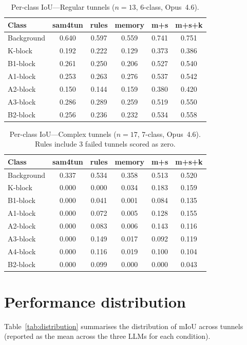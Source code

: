 \begin{table}[ht]
\caption{Per-class IoU---Regular tunnels ($n=13$, 6-class, Opus~4.6).}\label{tab:perclass-regular}
\begin{tabular*}{\tblwidth}{@{} l c c c c c @{}}
\toprule
Class & sam4tun & rules & memory & m+s & m+s+k \\
\midrule
Background & 0.640 & 0.597 & 0.559 & 0.741 & 0.751 \\
K-block & 0.192 & 0.222 & 0.129 & 0.373 & 0.386 \\
B1-block & 0.261 & 0.250 & 0.206 & 0.527 & 0.540 \\
A1-block & 0.253 & 0.263 & 0.276 & 0.537 & 0.542 \\
A2-block & 0.150 & 0.144 & 0.159 & 0.380 & 0.420 \\
A3-block & 0.286 & 0.289 & 0.259 & 0.519 & 0.550 \\
B2-block & 0.256 & 0.236 & 0.232 & 0.534 & 0.558 \\
\bottomrule
\end{tabular*}
\end{table}

\begin{table}[ht]
\caption{Per-class IoU---Complex tunnels ($n=17$, 7-class, Opus~4.6). Rules include 3 failed tunnels scored as zero.}\label{tab:perclass-complex}
\begin{tabular*}{\tblwidth}{@{} l c c c c c @{}}
\toprule
Class & sam4tun & rules & memory & m+s & m+s+k \\
\midrule
Background & 0.337 & 0.534 & 0.358 & 0.513 & 0.520 \\
K-block & 0.000 & 0.000 & 0.034 & 0.183 & 0.159 \\
B1-block & 0.000 & 0.041 & 0.001 & 0.084 & 0.135 \\
A1-block & 0.000 & 0.072 & 0.005 & 0.128 & 0.155 \\
A2-block & 0.000 & 0.083 & 0.006 & 0.143 & 0.116 \\
A3-block & 0.000 & 0.149 & 0.017 & 0.092 & 0.119 \\
A4-block & 0.000 & 0.116 & 0.019 & 0.100 & 0.104 \\
B2-block & 0.000 & 0.099 & 0.000 & 0.000 & 0.043 \\
\bottomrule
\end{tabular*}
\end{table}

\section{Performance distribution}\label{app:distribution}
Table~\ref{tab:distribution} summarises the distribution of mIoU across tunnels (reported as the mean across the three LLMs for each condition).

